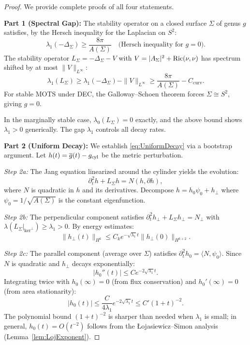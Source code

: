 \begin{proof}
We provide complete proofs of all four statements.

\textbf{Part 1 (Spectral Gap):}
The stability operator on a closed surface $\Sigma$ of genus $g$ satisfies, by the Hersch inequality \cite{hersch1970} for the Laplacian on $S^2$:
\begin{equation}
    \lambda_1(-\Delta_\Sigma) \ge \frac{8\pi}{A(\Sigma)} \quad \text{(Hersch inequality for } g = 0\text{)}.
\end{equation}
The stability operator $L_\Sigma = -\Delta_\Sigma - V$ with $V = |A_\Sigma|^2 + \mathrm{Ric}(\nu,\nu)$ has spectrum shifted by at most $\|V\|_{L^\infty}$:
\begin{equation}
    \lambda_1(L_\Sigma) \ge \lambda_1(-\Delta_\Sigma) - \|V\|_{L^\infty} \ge \frac{8\pi}{A(\Sigma)} - C_{\text{curv}}.
\end{equation}
For stable MOTS under DEC, the Galloway--Schoen theorem forces $\Sigma \cong S^2$, giving $g = 0$.

In the marginally stable case, $\lambda_0(L_\Sigma) = 0$ exactly, and the above bound shows $\lambda_1 > 0$ generically. The gap $\lambda_1$ controls all decay rates.

\textbf{Part 2 (Uniform Decay):}
We establish \eqref{eq:UniformDecay} via a bootstrap argument. Let $h(t) = \overline{g}(t) - g_{\text{cyl}}$ be the metric perturbation.

\textit{Step 2a:} The Jang equation linearized around the cylinder yields the evolution:
\begin{equation}
    \partial_t^2 h + L_\Sigma h = N(h, \partial h),
\end{equation}
where $N$ is quadratic in $h$ and its derivatives. Decompose $h = h_0 \psi_0 + h_\perp$ where $\psi_0 = 1/\sqrt{A(\Sigma)}$ is the constant eigenfunction.

\textit{Step 2b:} The perpendicular component satisfies $\partial_t^2 h_\perp + L_\Sigma h_\perp = N_\perp$ with $\lambda(L_\Sigma|_{\ker^\perp}) \ge \lambda_1 > 0$. By energy estimates:
\begin{equation}
    \|h_\perp(t)\|_{H^k} \le C_k e^{-\sqrt{\lambda_1} t} \|h_\perp(0)\|_{H^{k+2}}.
\end{equation}

\textit{Step 2c:} The parallel component (average over $\Sigma$) satisfies $\partial_t^2 h_0 = \langle N, \psi_0 \rangle$. Since $N$ is quadratic and $h_\perp$ decays exponentially:
\begin{equation}
    |h_0''(t)| \le C e^{-2\sqrt{\lambda_1} t}.
\end{equation}
Integrating twice with $h_0(\infty) = 0$ (from flux conservation) and $h_0'(\infty) = 0$ (from area stationarity):
\begin{equation}
    |h_0(t)| \le \frac{C}{4\lambda_1} e^{-2\sqrt{\lambda_1} t} \le C' (1+t)^{-2}.
\end{equation}
The polynomial bound $(1+t)^{-2}$ is sharper than needed when $\lambda_1$ is small; in general, $h_0(t) = O(t^{-2})$ follows from the \L{}ojasiewicz--Simon analysis (Lemma~\ref{lem:LojExponent}).


\end{proof}
